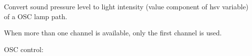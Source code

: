Convert sound pressure level to light intensity (value component of hsv variable) of a OSC lamp path.

When more than one channel is available, only the first channel is used.



OSC control:


